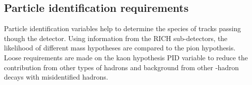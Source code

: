 




% 





% 




% 








\clearpage


\subsection{Particle identification requirements}
\label{sec:pidrequirements}
Particle identification variables help to determine the species of tracks passing though the \lhcb detector. Using information from the RICH sub-detectors, the likelihood of different mass hypotheses are compared to the pion hypothesis. Loose requirements are made on the kaon hypothesis PID variable to reduce the contribution from other types of hadrons and background from other \bquark-hadron decays with misidentified hadrons. 




